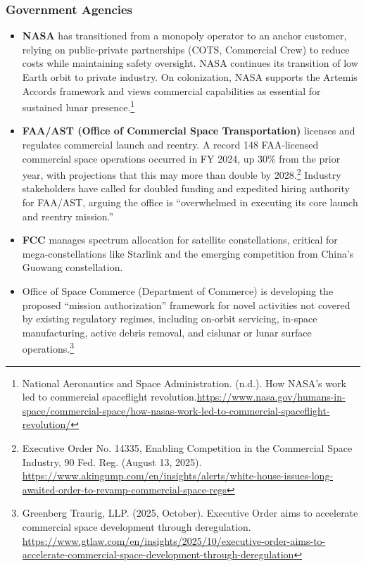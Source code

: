 \subsubsection{Government Agencies}

\begin{itemize}
  \item \textbf{NASA} has transitioned from a monopoly operator to an anchor customer, relying on public-private partnerships (COTS, Commercial Crew) to reduce costs while maintaining safety oversight. NASA continues its transition of low Earth orbit to private industry. On colonization, NASA supports the Artemis Accords framework and views commercial capabilities as essential for sustained lunar presence.\footnote{National Aeronautics and Space Administration. (n.d.). How NASA's work led to commercial spaceflight revolution.\url{https://www.nasa.gov/humans-in-space/commercial-space/how-nasas-work-led-to-commercial-spaceflight-revolution/}}
  \item \textbf{FAA/AST (Office of Commercial Space Transportation)} licenses and regulates commercial launch and reentry. A record 148 FAA-licensed commercial space operations occurred in FY 2024, up 30\% from the prior year, with projections that this may more than double by 2028.\footnote{Executive Order No. 14335, Enabling Competition in the Commercial Space Industry, 90 Fed. Reg. (August 13, 2025). \url{https://www.akingump.com/en/insights/alerts/white-house-issues-long-awaited-order-to-revamp-commercial-space-regs}} Industry stakeholders have called for doubled funding and expedited hiring authority for FAA/AST, arguing the office is “overwhelmed in executing its core launch and reentry mission.”
  \item \textbf{FCC} manages spectrum allocation for satellite constellations, critical for mega-constellations like Starlink and the emerging competition from China’s Guowang constellation.
  \item Office of Space Commerce (Department of Commerce) is developing the proposed “mission authorization” framework for novel activities not covered by existing regulatory regimes, including on-orbit servicing, in-space manufacturing, active debris removal, and cislunar or lunar surface operations.\footnote{Greenberg Traurig, LLP. (2025, October). Executive Order aims to accelerate commercial space development through deregulation. \url{https://www.gtlaw.com/en/insights/2025/10/executive-order-aims-to-accelerate-commercial-space-development-through-deregulation}}
\end{itemize}

